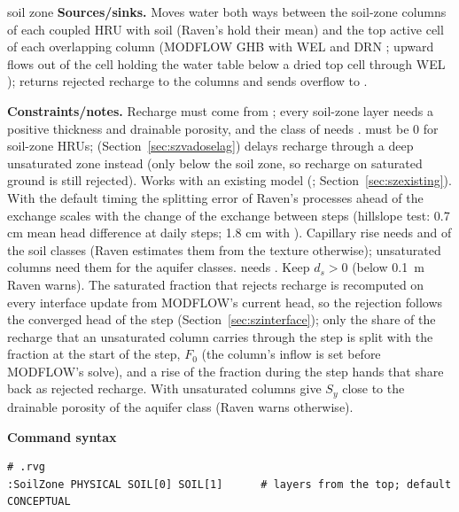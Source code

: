 \begin{refcard}{soil zone}
\textbf{Sources/sinks.} Moves water both ways between the soil-zone columns of each coupled HRU with soil (Raven's
 hold their mean) and the top active cell of each overlapping column (MODFLOW GHB  with WEL
 and DRN ; upward flows out of the cell holding the water table below a dried top cell
through WEL ); returns rejected recharge to the columns and sends overflow to .\par\smallskip
\textbf{Constraints/notes.} Recharge must come from ; every soil-zone layer needs a positive thickness and
drainable porosity, and the class of  needs .  must be 0 for
soil-zone HRUs;  (Section~\ref{sec:szvadoselag}) delays recharge through a deep unsaturated zone instead
(only below the soil zone, so recharge on saturated ground is still rejected). Works with an existing model (; Section~\ref{sec:szexisting}). With the default
 timing the splitting error of Raven's processes ahead of the exchange scales with the change of the
exchange between steps (hillslope test: 0.7 cm mean head difference at daily steps; 1.8 cm with ).
Capillary rise needs  and  of the soil classes (Raven estimates them from the
texture otherwise); unsaturated columns need them for the aquifer classes.  needs
. Keep $d_s>0$ (below 0.1~m Raven warns). The saturated fraction that rejects recharge is
recomputed on every interface update from MODFLOW's current head, so the rejection follows the converged head of the
step (Section~\ref{sec:szinterface}); only the share of the recharge that an unsaturated column carries through the
step is split with the fraction at the start of the step, $F_0$ (the column's inflow is set before MODFLOW's solve), and
a rise of the fraction during the step hands that share back as rejected recharge. With unsaturated columns give $S_y$ close to the drainable porosity of
the aquifer class (Raven warns otherwise).\par\smallskip
\par\noindent\begin{minipage}{\linewidth}\textbf{Command syntax}
\begin{lstlisting}
# .rvg
:SoilZone PHYSICAL SOIL[0] SOIL[1]      # layers from the top; default CONCEPTUAL

\end{lstlisting}
\end{minipage}
\end{refcard}
